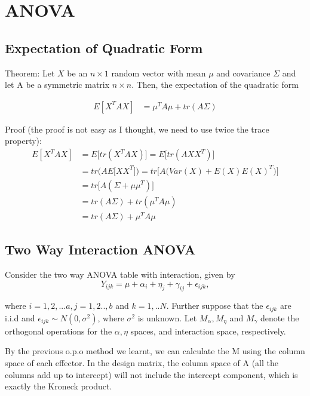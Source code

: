  \section{ANOVA}

\subsection{Expectation of Quadratic Form}
Theorem: Let $X$ be an $n \times 1$ random vector with mean $\mu$ and covariance $\Sigma$ and let A be a symmetric matrix $n \times n$. Then, the expectation of the quadratic form 

\begin{align*}
  E[X^T A X] &= \mu^T A \mu + tr(A \Sigma) 
\end{align*}

Proof (the proof is not easy as I thought, we need to use twice the trace property):
\begin{align*}
  E[X^T A X] &= E \Big[ tr(X^T A X) \Big] = E \Big[ tr(A X X^T ) \Big] \\
  &= tr \Big( A E \Big[ X X^T  \Big] \Big) =  tr \Big[ A \Big( Var(X) + E(X) E(X)^T  \Big) \Big] \\
  &= tr \Big[ A ( \Sigma+ \mu \mu^T) \Big] \\
  &= tr(A\Sigma) + tr(\mu^T A \mu) \\
  &= tr(A\Sigma) + \mu^T A \mu
\end{align*}


\subsection{Two Way Interaction ANOVA}

 Consider the two way ANOVA table with interaction, given by
   \[ 
   Y_{ijk}  = \mu + \alpha_i + \eta_j + \gamma_{ij} + \epsilon_{ijk},
    \] 
    
 where $i=1,2,...a, j=1,2.., b$ and $k=1,..N$. Further suppose that the $\epsilon_{ijk}$ are i.i.d and $\epsilon_{ijk} \sim N(0, \sigma^2)$, where $\sigma^2$ is unknown. Let $M_{\alpha}, M_{\eta}$ and $M_{\gamma}$ denote the orthogonal operations for the $\alpha, \eta$ spaces, and interaction space, respectively.  
 
 By the previous o.p.o method we learnt, we can calculate the M using the column space of each effector. In the design matrix, the column space of A (all the columns add up to intercept) will not include the intercept component, which is exactly the Kroneck product. 
 
